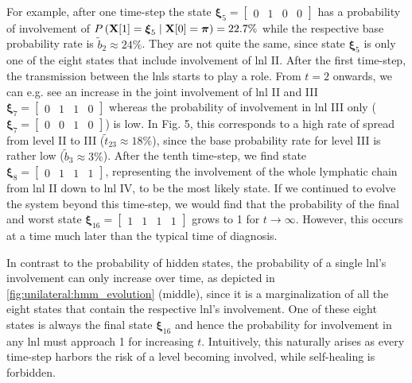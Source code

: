\documentclass[\relativeRoot/main.tex]{subfiles}
\begin{document}
For example, after one time-step the state $\boldsymbol{\xi}_5 = \begin{bmatrix} 0 & 1 & 0 & 0 \end{bmatrix}$ has a probability of involvement of $P \left( \mathbf{X}[1] = \boldsymbol{\xi}_5 \mid \mathbf{X}[0]=\boldsymbol{\pi} \right) = 22.7\%$ while the respective base probability rate is $\tilde{b}_2 \approx 24\%$. They are not quite the same, since state $\boldsymbol{\xi}_5$ is only one of the eight states that include involvement of \gls{lnl} II. After the first time-step, the transmission between the \glspl{lnl} starts to play a role. From $t=2$ onwards, we can e.g. see an increase in the joint involvement of \gls{lnl} II and III $\boldsymbol{\xi}_7 = \begin{bmatrix} 0 & 1 & 1 & 0 \end{bmatrix}$ whereas the probability of involvement in \gls{lnl} III only ($\boldsymbol{\xi}_7 = \begin{bmatrix} 0 & 0 & 1 & 0 \end{bmatrix}$) is low. In Fig. 5, this corresponds to a high rate of spread from level II to III ($\tilde{t}_{23} \approx 18\%$), since the base probability rate for level III is rather low ($\tilde{b}_3 \approx 3\%$). After the tenth time-step, we find state $\boldsymbol{\xi}_8 = \begin{bmatrix} 0 & 1 & 1 & 1 \end{bmatrix}$, representing the involvement of the whole lymphatic chain from \gls{lnl} II down to \gls{lnl} IV, to be the most likely state. If we continued to evolve the system beyond this time-step, we would find that the probability of the final and worst state $\boldsymbol{\xi}_{16} = \begin{bmatrix} 1 & 1 & 1 & 1 \end{bmatrix}$ grows to 1 for $t \rightarrow \infty$. However, this occurs at a time much later than the typical time of diagnosis.

In contrast to the probability of hidden states, the probability of a single \gls{lnl}'s involvement can only increase over time, as depicted in \cref{fig:unilateral:hmm_evolution} (middle), since it is a marginalization of all the eight states that contain the respective \gls{lnl}'s involvement. One of these eight states is always the final state $\boldsymbol{\xi}_{16}$ and hence the probability for involvement in any \gls{lnl} must approach 1 for increasing $t$. Intuitively, this naturally arises as every time-step harbors the risk of a level becoming involved, while self-healing is forbidden.
\end{document}
